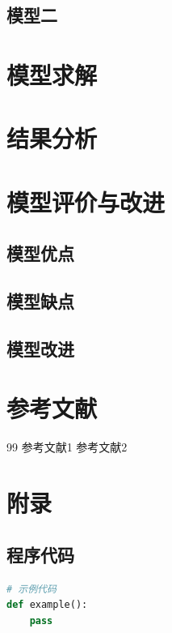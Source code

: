\documentclass[12pt,a4paper]{article}
\begin{document}
\subsection{模型二}


\section{模型求解}


\section{结果分析}


\section{模型评价与改进}

\subsection{模型优点}


\subsection{模型缺点}


\subsection{模型改进}


\section{参考文献}

\begin{thebibliography}{99}
     参考文献1
     参考文献2
\end{thebibliography}

\newpage
\appendix
\section{附录}

\subsection{程序代码}


\begin{lstlisting}[language=Python]
# 示例代码
def example():
    pass
\end{lstlisting}
\end{document}
